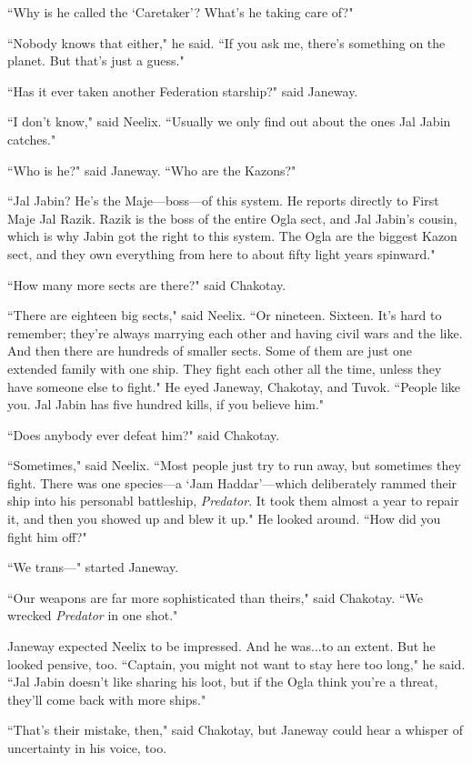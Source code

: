 \documentclass[twoside,letterpaper,12pt]{memoir}
\begin{document}
``Why is he called the `Caretaker'? What's he taking care of?"

``Nobody knows that either," he said. ``If you ask me, there's something on the planet. But that's just a guess."

``Has it ever taken another Federation starship?" said Janeway.

``I don't know," said Neelix. ``Usually we only find out about the ones Jal Jabin catches."

``Who is he?" said Janeway. ``Who are the Kazons?"

``Jal Jabin? He's the Maje---boss---of this system. He reports directly to First Maje Jal Razik. Razik is the boss of the entire Ogla sect, and Jal Jabin’s cousin, which is why Jabin got the right to this system. The Ogla are the biggest Kazon sect, and they own everything from here to about fifty light years spinward."

``How many more sects are there?" said Chakotay.

``There are eighteen big sects," said Neelix. ``Or nineteen. Sixteen. It's hard to remember; they're always marrying each other and having civil wars and the like. And then there are hundreds of smaller sects. Some of them are just one extended family with one ship. They fight each other all the time, unless they have someone else to fight." He eyed Janeway, Chakotay, and Tuvok. ``People like you. Jal Jabin has five hundred kills, if you believe him."

``Does anybody ever defeat him?" said Chakotay.

``Sometimes," said Neelix. ``Most people just try to run away, but sometimes they fight. There was one species---a `Jam Haddar'---which deliberately rammed their ship into his personabl battleship, \textit{Predator}. It took them almost a year to repair it, and then you showed up and blew it up." He looked around. ``How did you fight him off?"

``We trans---" started Janeway.

``Our weapons are far more sophisticated than theirs," said Chakotay. ``We wrecked \textit{Predator} in one shot."

Janeway expected Neelix to be impressed. And he was...to an extent. But he looked pensive, too. ``Captain, you might not want to stay here too long," he said. ``Jal Jabin doesn't like sharing his loot, but if the Ogla think you're a threat, they'll come back with more ships."

``That's their mistake, then," said Chakotay, but Janeway could hear a whisper of uncertainty in his voice, too.
\end{document}
